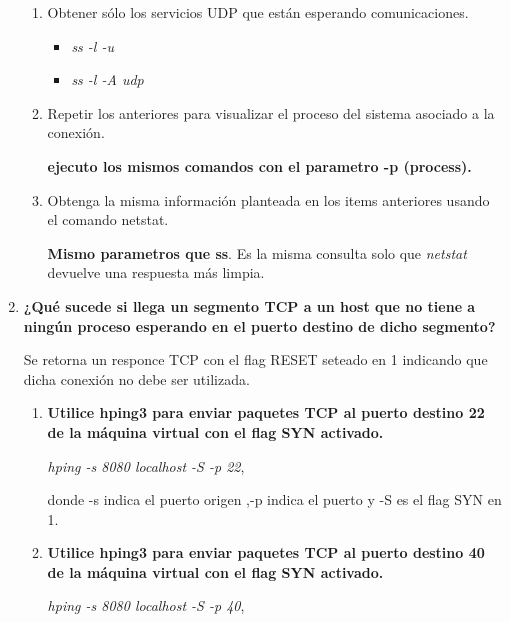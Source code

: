 \documentclass[a4paper,10pt]{article}
\begin{document}
\begin{enumerate}
\begin{enumerate}
            \item Obtener sólo los servicios UDP que están esperando comunicaciones.
            
                \begin{itemize}
                    \item \textit{ss -l -u}
                    \item \textit{ss -l -A udp}
                \end{itemize}
                
            \item Repetir los anteriores para visualizar el proceso del sistema asociado a la conexión.
            
            \textbf{ejecuto los mismos comandos con el parametro -p (process).}
            
            \item Obtenga la misma información planteada en los items anteriores usando el comando netstat.
            
            \textbf{Mismo parametros que ss}. Es la misma consulta solo que \textit{netstat} devuelve una respuesta más limpia.
            
                
        \end{enumerate}
    
    \item \textbf{¿Qué sucede si llega un segmento TCP a un host que no tiene a ningún proceso esperando en el puerto destino de dicho segmento?}
    
    Se retorna un responce TCP con el flag RESET seteado en 1 indicando que dicha conexión no debe ser utilizada.
    
        \begin{enumerate}
            \item \textbf{Utilice hping3 para enviar paquetes TCP al puerto destino 22 de la máquina virtual con el flag SYN activado.}
            
            \textit{hping -s 8080 localhost -S -p 22}, 
            
            donde -s indica el puerto origen ,-p indica el puerto y -S es el flag SYN en 1.
            
            \item \textbf{Utilice hping3 para enviar paquetes TCP al puerto destino 40 de la máquina virtual con el flag SYN activado.}
            
            \textit{hping -s 8080 localhost -S -p 40}, 
            

\end{enumerate}
\end{enumerate}
\end{document}
